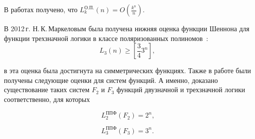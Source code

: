 \documentclass [12pt, a4paper] {article}
\begin{document}
В работах \cite{sd08, bs14} получено, что
$L^{\text{О.П.}}_k(n) = O(\frac{k ^ n}{n})$.

В 2012\,г. Н.\,К.\,Маркеловым была получена нижняя оценка функции Шеннона для
функции трехзначной логики в классе поляризованных полиномов~\cite{mn12}:
$$
L_3(n) \geqslant \left[\frac{3}{4}3^n\right],
$$

в \cite{ss15} эта оценка была
достигнута на симметрических функциях.  Также в работе \cite{ss15} были
получены следующие оценки для систем функций.  А именно, доказано существование
таких систем $F_2$ и $F_3$ функций двузначной и трехзначной логики
соответственно, для которых

\[ L_2^\text{ППФ}(F_2) = 2^n \text{,} \] 

\[ L_3^\text{ППФ}(F_3) = 3^n \text{.} \]


\makeatletter
\renewcommand*{\@biblabel}[1]{\hfill#1.}
\makeatother

\newpage
\end{document}
